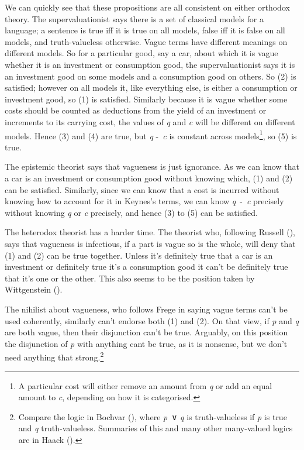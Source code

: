 \documentclass[
  10pt,
  letterpaper,
  DIV=11,
  numbers=noendperiod,
  twoside]{scrartcl}
\begin{document}
We can quickly see that these propositions are all consistent on either
orthodox theory. The supervaluationist says there is a set of classical
models for a language; a sentence is true iff it is true on all models,
false iff it is false on all models, and truth-valueless otherwise.
Vague terms have different meanings on different models. So for a
particular good, say a car, about which it is vague whether it is an
investment or consumption good, the supervaluationist says it is an
investment good on some models and a consumption good on others. So (2)
is satisfied; however on all models it, like everything else, is either
a consumption or investment good, so (1) is satisfied. Similarly because
it is vague whether some costs should be counted as deductions from the
yield of an investment or increments to its carrying cost, the values of
\emph{q} and \emph{c} will be different on different models. Hence (3)
and (4) are true, but \emph{q} -~\emph{c} is constant across
models\footnote{A particular cost will either remove an amount from
  \emph{q} or add an equal amount to \emph{c}, depending on how it is
  categorised.}, so (5) is true.

The epistemic theorist says that vagueness is just ignorance. As we can
know that a car is an investment or consumption good without knowing
which, (1) and (2) can be satisfied. Similarly, since we can know that a
cost is incurred without knowing how to account for it in Keynes's
terms, we can know \emph{q}~-~\emph{c} precisely without knowing
\emph{q} or \emph{c} precisely, and hence (3) to (5) can be satisfied.

The heterodox theorist has a harder time. The theorist who, following
Russell (), says that vagueness is
infectious, if a part is vague so is the whole, will deny that (1) and
(2) can be true together. Unless it's definitely true that a car is an
investment or definitely true it's a consumption good it can't be
definitely true that it's one or the other. This also seems to be the
position taken by Wittgenstein ().

The nihilist about vagueness, who follows Frege in saying vague terms
can't be used coherently, similarly can't endorse both (1) and (2). On
that view, if \emph{p} and \emph{q} are both vague, then their
disjunction can't be true. Arguably, on this position the disjunction of
\emph{p} with anything cant be true, as it is nonsense, but we don't
need anything that strong.\footnote{Compare the logic in Bochvar
  (), where \emph{p}~∨ \emph{q} is
  truth-valueless if \emph{p} is true and \emph{q} truth-valueless.
  Summaries of this and many other many-valued logics are in Haack
  ().}
\end{document}
